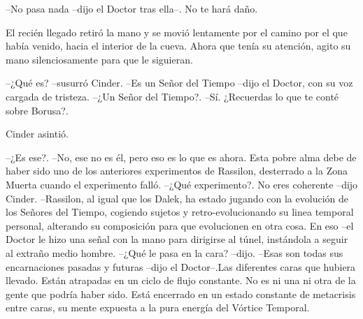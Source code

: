 --No pasa nada --dijo el Doctor tras ella--. No te hará daño.

El recién llegado retiró la mano y se movió lentamente por el camino por el que había venido, hacia el interior de la cueva. Ahora que tenía su atención, agito su mano silenciosamente para que le siguieran.

--¿Qué es? --susurró Cinder.
--Es un Señor del Tiempo --dijo el Doctor, con su voz cargada de tristeza.
--¿Un Señor del Tiempo?.
--Sí. ¿Recuerdas lo que te conté sobre Borusa?.

Cinder asintió. 

--¿Es ese?.
--No, ese no es él, pero eso es lo que es ahora. Esta pobre alma debe de haber sido uno de los anteriores experimentos de Rassilon, desterrado a la Zona Muerta cuando el experimento falló.
--¿Qué experimento?. No eres coherente --dijo Cinder.
--Rassilon, al igual que los Dalek, ha estado jugando con la evolución de los Señores del Tiempo, cogiendo sujetos y retro-evolucionando su linea temporal personal, alterando su composición para que evolucionen en otra cosa. En eso --el Doctor le hizo una señal con la mano para dirigirse al túnel, instándola a seguir al extraño medio hombre.
--¿Qué le pasa en la cara? --dijo.
--Esas son todas sus encarnaciones pasadas y futuras --dijo el Doctor--.Las diferentes caras que hubiera llevado. Están atrapadas en un ciclo de flujo constante. No es ni una ni otra de la gente que podría haber sido. Está encerrado en un estado constante de metacrisis entre caras, su mente expuesta a la pura energía del Vórtice Temporal.

